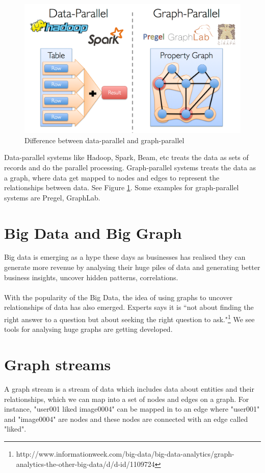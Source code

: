 \documentclass[12pt]{report}
\numberwithin{figure}{section}
\numberwithin{table}{section}
\begin{document}
\begin{figure}[H]
\centering
\includegraphics[scale=0.3]{images/image00}
\caption{Difference between data-parallel and graph-parallel}
\label{fig:parallel}
\end{figure}

Data-parallel systems like Hadoop, Spark, Beam, etc treats the data as sets of records and do the parallel processing. Graph-parallel systems treats the data as a graph, where data get mapped to nodes and edges to represent the relationships between data. See Figure \ref{fig:parallel}. Some examples for graph-parallel systems are Pregel, GraphLab.

\section{Big Data and Big Graph}
Big data is emerging as a hype these days as businesses has realised they can generate more revenue by analysing their huge piles of data and generating better business insights,  uncover hidden patterns, correlations. 

\paragraph{}

With the popularity of the Big Data, the idea of using graphs to uncover relationships of data has also emerged. Experts says it is “not about finding the right answer to a question but about seeking the right question to ask."\footnote{http://www.informationweek.com/big-data/big-data-analytics/graph-analytics-the-other-big-data/d/d-id/1109724} We see tools for analysing huge graphs are getting developed.

\section{Graph streams}
A graph stream is a stream of data which includes data about entities and their relationships, which we can map into a set of nodes and edges on a graph. For instance, "user001 liked image0004" can be mapped in to an edge where "user001" and "image0004" are nodes and these nodes are connected with an edge called "liked".
\end{document}
